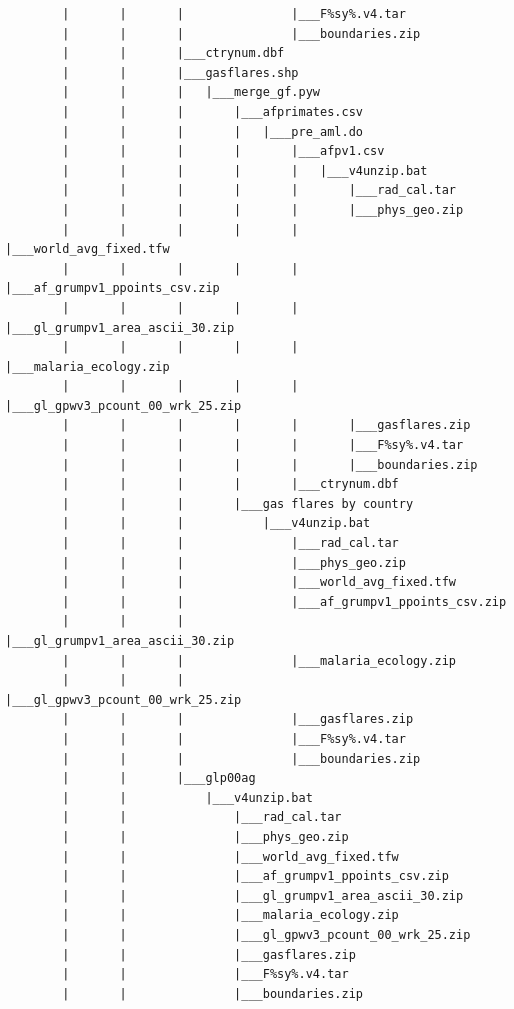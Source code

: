 \documentclass[]{book}
\begin{document}
\begin{verbatim}
        |       |       |               |___F%sy%.v4.tar
        |       |       |               |___boundaries.zip
        |       |       |___ctrynum.dbf
        |       |       |___gasflares.shp
        |       |       |   |___merge_gf.pyw
        |       |       |       |___afprimates.csv
        |       |       |       |   |___pre_aml.do
        |       |       |       |       |___afpv1.csv
        |       |       |       |       |   |___v4unzip.bat
        |       |       |       |       |       |___rad_cal.tar
        |       |       |       |       |       |___phys_geo.zip
        |       |       |       |       |       |___world_avg_fixed.tfw
        |       |       |       |       |       |___af_grumpv1_ppoints_csv.zip
        |       |       |       |       |       |___gl_grumpv1_area_ascii_30.zip
        |       |       |       |       |       |___malaria_ecology.zip
        |       |       |       |       |       |___gl_gpwv3_pcount_00_wrk_25.zip
        |       |       |       |       |       |___gasflares.zip
        |       |       |       |       |       |___F%sy%.v4.tar
        |       |       |       |       |       |___boundaries.zip
        |       |       |       |       |___ctrynum.dbf
        |       |       |       |___gas flares by country
        |       |       |           |___v4unzip.bat
        |       |       |               |___rad_cal.tar
        |       |       |               |___phys_geo.zip
        |       |       |               |___world_avg_fixed.tfw
        |       |       |               |___af_grumpv1_ppoints_csv.zip
        |       |       |               |___gl_grumpv1_area_ascii_30.zip
        |       |       |               |___malaria_ecology.zip
        |       |       |               |___gl_gpwv3_pcount_00_wrk_25.zip
        |       |       |               |___gasflares.zip
        |       |       |               |___F%sy%.v4.tar
        |       |       |               |___boundaries.zip
        |       |       |___glp00ag
        |       |           |___v4unzip.bat
        |       |               |___rad_cal.tar
        |       |               |___phys_geo.zip
        |       |               |___world_avg_fixed.tfw
        |       |               |___af_grumpv1_ppoints_csv.zip
        |       |               |___gl_grumpv1_area_ascii_30.zip
        |       |               |___malaria_ecology.zip
        |       |               |___gl_gpwv3_pcount_00_wrk_25.zip
        |       |               |___gasflares.zip
        |       |               |___F%sy%.v4.tar
        |       |               |___boundaries.zip

\end{verbatim}
\end{document}
